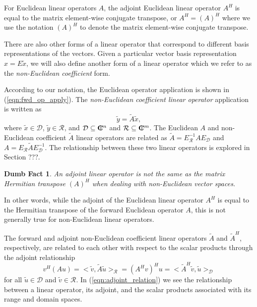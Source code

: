 \documentclass[pdf,ps2pdf,11pt]{SANDreport}
\newtheorem{dumb_fact}{Dumb Fact}[section]
\begin{document}
For Euclidean linear operators $A$, the adjoint Euclidean linear operator
$A^H$ is equal to the matrix element-wise conjugate transpose, or $A^H =
(A)^H$ where we use the notation $(A)^H$ to denote the matrix element-wise
conjugate transpose.

There are also other forms of a linear operator that correspond to different
basis representations of the vectors.  Given a particular vector basis
representation $x = E {}\tilde{x}$, we will also define another form of a
linear operator which we refer to as the {}\textit{non-Euclidean coefficient}
form.

According to our notation, the Euclidean operator application is shown in
(\ref{eqn:fwd_op_apply}).  The {}\textit{non-Euclidean coefficient linear
operator} application is written as
%
\begin{equation}
\tilde{y} = \tilde{A} \tilde{x},
\label{eqn:fwd_op_apply_euclidean}
\end{equation}
%
where $\tilde{x}\in\mathcal{D}$, $\tilde{y}\in\mathcal{R}$, and
$\mathcal{D}\subseteq\mbox{\textbf{C}}\hspace{-1.1ex}\mbox{l}\hspace{0.4ex}^n$ and $\mathcal{R}\subseteq\mbox{\textbf{C}}\hspace{-1.1ex}\mbox{l}\hspace{0.4ex}^m$.  The
Euclidean $A$ and non-Euclidean coefficient $\tilde{A}$ linear operators are
related as $\tilde{A} = E_{\mathcal{R}}^{-1} A E_{\mathcal{D}}$ and $A =
E_{\mathcal{R}} {}\tilde{A} E_{\mathcal{D}}^{-1}$.  The relationship between
these two linear operators is explored in Section ???.

{}\begin{dumb_fact} An adjoint linear operator is not the same as the matrix
Hermitian transpose $(A)^H$ when dealing with non-Euclidean vector spaces.
{}\end{dumb_fact}

In other words, while the adjoint of the Euclidean linear operator $A^H$ is
equal to the Hermitian transpose of the forward Euclidean operator $A$, this is
not generally true for non-Euclidean linear operators.

The forward and adjoint non-Euclidean coefficient linear operators
$\tilde{A}$ and $\tilde{A}^H$, respectively, are related to each other with
respect to the scalar products through the adjoint relationship
%
\begin{equation}
v^H (A u)
= <\tilde{v},\tilde{A} \tilde{u}>_{\mathcal{R}}
= (A^H v)^H u
= <\tilde{A}^H \tilde{v},\tilde{u}>_{\mathcal{D}}
\label{eqn:adjoint_relation}
\end{equation}
%
for all $\tilde{u}\in\mathcal{D}$ and $\tilde{v}\in\mathcal{R}$.  In
(\ref{eqn:adjoint_relation}) we see the relationship between a linear
operator, its adjoint, and the scalar products associated with its range and
domain spaces.
\end{document}
